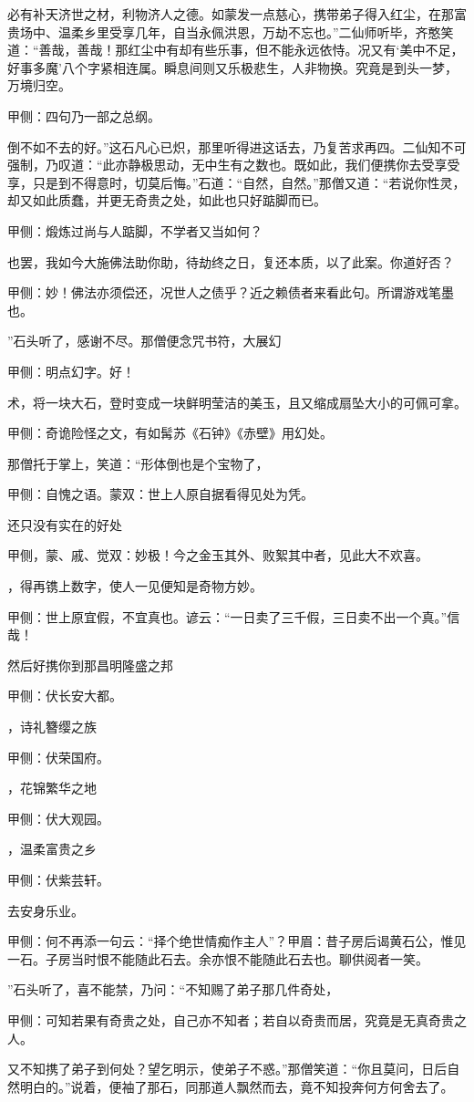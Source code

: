 \begin{parag}
必有补天济世之材，利物济人之德。如蒙发一点慈心，携带弟子得入红尘，在那富贵场中、温柔乡里受享几年，自当永佩洪恩，万劫不忘也。”二仙师听毕，齐憨笑道：“善哉，善哉！那红尘中有却有些乐事，但不能永远依恃。况又有‘美中不足，好事多魔’八个字紧相连属。瞬息间则又乐极悲生，人非物换。究竟是到头一梦，万境归空。\begin{note}甲侧：四句乃一部之总纲。\end{note}倒不如不去的好。”这石凡心已炽，那里听得进这话去，乃复苦求再四。二仙知不可强制，乃叹道：“此亦静极思动，无中生有之数也。既如此，我们便携你去受享受享，只是到不得意时，切莫后悔。”石道：“自然，自然。”那僧又道：“若说你性灵，却又如此质蠢，并更无奇贵之处，如此也只好踮脚而已。\begin{note}甲侧：煅炼过尚与人踮脚，不学者又当如何？\end{note}也罢，我如今大施佛法助你助，待劫终之日，复还本质，以了此案。你道好否？\begin{note}甲侧：妙！佛法亦须偿还，况世人之债乎？近之赖债者来看此句。所谓游戏笔墨也。\end{note}”石头听了，感谢不尽。那僧便念咒书符，大展幻\begin{note}甲侧：明点幻字。好！\end{note}术，将一块大石，登时变成一块鲜明莹洁的美玉，且又缩成扇坠大小的可佩可拿。\begin{note}甲侧：奇诡险怪之文，有如髯苏《石钟》《赤壁》用幻处。\end{note}那僧托于掌上，笑道：“形体倒也是个宝物了，\begin{note}甲侧：自愧之语。蒙双：世上人原自据看得见处为凭。\end{note}还只没有实在的好处\begin{note}甲侧，蒙、戚、觉双：妙极！今之金玉其外、败絮其中者，见此大不欢喜。\end{note}，得再镌上数字，使人一见便知是奇物方妙。\begin{note}甲侧：世上原宜假，不宜真也。谚云：“一日卖了三千假，三日卖不出一个真。”信哉！\end{note}然后好携你到那昌明隆盛之邦\begin{note}甲侧：伏长安大都。\end{note}，诗礼簪缨之族\begin{note}甲侧：伏荣国府。\end{note}，花锦繁华之地\begin{note}甲侧：伏大观园。\end{note}，温柔富贵之乡\begin{note}甲侧：伏紫芸轩。\end{note}去安身乐业。\begin{note}甲侧：何不再添一句云：“择个绝世情痴作主人”？甲眉：昔子房后谒黄石公，惟见一石。子房当时恨不能随此石去。余亦恨不能随此石去也。聊供阅者一笑。\end{note}”石头听了，喜不能禁，乃问：“不知赐了弟子那几件奇处，\begin{note}甲侧：可知若果有奇贵之处，自己亦不知者；若自以奇贵而居，究竟是无真奇贵之人。\end{note}又不知携了弟子到何处？望乞明示，使弟子不惑。”那僧笑道：“你且莫问，日后自然明白的。”说着，便袖了那石，同那道人飘然而去，竟不知投奔何方何舍去了。

\end{parag}


